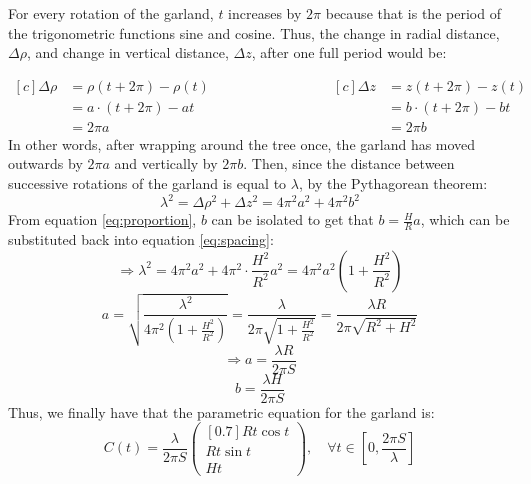 For every rotation of the garland, $t$ increases by $2\pi$ because that is the period of the trigonometric functions sine and cosine. Thus, the change in radial distance, $\Delta \rho$, and change in vertical distance, $\Delta z$, after one full period would be:

\begin{equation*}
    \begin{aligned}[c]
        \Delta \rho & = \rho(t+2\pi) -\rho(t) \\
                    & = a\cdot(t+2\pi) - at   \\
                    & = 2\pi a
    \end{aligned}
    \qquad\qquad\qquad\qquad
    \begin{aligned}[c]
        \Delta z & = z(t+2\pi) -z(t)     \\
                 & = b\cdot(t+2\pi) - bt \\
                 & = 2\pi b
    \end{aligned}
\end{equation*}
In other words, after wrapping around the tree once, the garland has moved outwards by $2\pi a$ and vertically by $2\pi b$. Then, since the distance between successive rotations of the garland is equal to $\lambda$, by the Pythagorean theorem:
\begin{equation}
    \lambda^2 = \Delta \rho^2 + \Delta z^2 =4\pi^2a^2+4\pi^2b^2 \label{eq:spacing}
\end{equation}
From equation \ref{eq:proportion}, $b$ can be isolated to get that $b = \frac{H}{R}a$, which can be substituted back into equation \ref{eq:spacing}:
\begin{equation*}
    \Rightarrow \lambda^2 = 4\pi^2a^2+4\pi^2\cdot\frac{H^2}{R^2} a^2 = 4\pi^2a^2\left(1+\frac{H^2}{R^2} \right)
\end{equation*}
\begin{equation*}
    a = \sqrt{\frac{\lambda^2}{4\pi^2(1+\frac{H^2}{R^2})}} = \frac{\lambda}{2\pi\sqrt{1+\frac{H^2}{R^2}}} = \frac{\lambda R}{2\pi\sqrt{R^2+H^2}}
\end{equation*}
\begin{equation}
    \Rightarrow a =\frac{\lambda R}{2\pi S}
\end{equation}
\begin{equation}
    b =\frac{\lambda H}{2\pi S}
\end{equation}
Thus, we finally have that the parametric equation for the garland is:
\begin{equation}
    C(t) = \frac{\lambda}{2\pi S}
    \begin{pmatrix}[0.7]
        Rt\cos{t} \\
        Rt\sin{t} \\
        Ht
    \end{pmatrix}, \quad \forall t \in \left[0, \frac{2\pi S}{\lambda}\right]
\end{equation}
